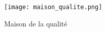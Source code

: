 

\newpage

\begin{figure}[htp]
	\centering
	\caption{Maison de la qualité}
	\label{f:cdc_maison}
	\texttt{[image: maison\_qualite.png]}
\end{figure}